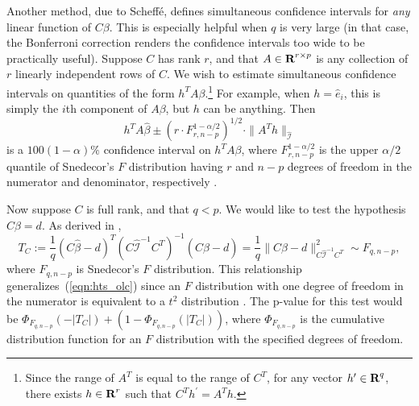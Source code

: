 \documentclass[12pt]{article}
\begin{document}
Another method, due to Scheff\'e, defines simultaneous confidence intervals for \textit{any} linear function of $C\beta$. This is especially helpful when $q$ is very large (in that case, the Bonferroni correction renders the confidence intervals too wide to be practically useful). Suppose $C$ has rank $r$, and that $A \in {\mbox{\bf R}}^{r \times p}$ is any collection of $r$ linearly independent rows of $C$. We wish to estimate simultaneous confidence intervals on quantities of the form $h^T A \beta$.\footnote{Since the range of $A^T$ is equal to the range of $C^T$, for any vector $h^\prime \in {\mbox{\bf R}}^q$, there exists $h \in {\mbox{\bf R}}^r$ such that $C^T h^\prime = A^T h$.} For example, when $h = \hat{e}_i$, this is simply the $i$th component of $A \beta$, but $h$ can be anything. Then
\begin{displaymath}
   h^T A \hat{\beta} \pm (r \cdot F_{r, n-p}^{1-\alpha/2})^{1/2} \cdot \| A^T h \|_{\hat{\mathcal{I}}}
\end{displaymath}
is a $100(1-\alpha)\%$ confidence interval on $h^T A \beta$, where $F_{r, n-p}^{1-\alpha/2}$ is the upper $\alpha/2$ quantile of Snedecor's $F$ distribution having $r$ and $n-p$ degrees of freedom in the numerator and denominator, respectively \cite[\S~5.1.1]{Seber:2003}.

Now suppose $C$ is full rank, and that $q < p$. We would like to test the hypothesis $C \beta = d$. As derived in \cite[\S~1.3.4]{Wood:2017},
\begin{displaymath}
   T_C := \frac{1}{q} (C \hat{\beta} - d)^T (C \hat{\mathcal{I}}^{-1} C^T)^{-1} (C \hat{\beta} - d) = \frac{1}{q}\| C \hat{\beta} - d \|_{C \hat{\mathcal{I}}^{-1} C^T}^2 \sim F_{q, n-p},
\end{displaymath}
where $F_{q, n-p}$ is Snedecor's $F$ distribution. This relationship generalizes~(\ref{eqn:hts_olc}) since an $F$ distribution with one degree of freedom in the numerator is equivalent to a $t^2$ distribution \cite[\S~3.5.3]{Weisberg:2005}. The p-value for this test would be $\Phi_{F_{q, n-p}}(-|T_C|) + (1 - \Phi_{F_{q, n-p}}(|T_C|))$, where $\Phi_{F_{q, n-p}}$ is the cumulative distribution function for an $F$ distribution with the specified degrees of freedom.
\end{document}
